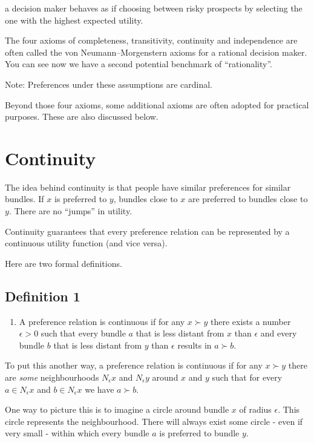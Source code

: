 \documentclass[
  letterpaper,
  DIV=11,
  numbers=noendperiod]{scrreprt}
\providecommand{\tightlist}{%
  \setlength{\itemsep}{0pt}\setlength{\parskip}{0pt}}\usepackage{longtable,booktabs,array}
\begin{document}
a decision maker behaves as if choosing between risky prospects by
selecting the one with the highest expected utility.

The four axioms of completeness, transitivity, continuity and
independence are often called the von Neumann--Morgenstern axioms for a
rational decision maker. You can see now we have a second potential
benchmark of ``rationality''.

Note: Preferences under these assumptions are cardinal.

Beyond those four axioms, some additional axioms are often adopted for
practical purposes. These are also discussed below.

\hypertarget{continuity}{%
\section{Continuity}\label{continuity}}

The idea behind continuity is that people have similar preferences for
similar bundles. If \(x\) is preferred to \(y\), bundles close to \(x\)
are preferred to bundles close to \(y\). There are no ``jumps'' in
utility.

Continuity guarantees that every preference relation can be represented
by a continuous utility function (and vice versa).

Here are two formal definitions.

\hypertarget{definition-1}{%
\subsection{Definition 1}\label{definition-1}}

\begin{enumerate}
\def\labelenumi{\arabic{enumi}.}
\tightlist
\item
  A preference relation is continuous if for any \(x \succ y\) there
  exists a number \(\epsilon > 0\) such that every bundle \(a\) that is
  less distant from \(x\) than \(\epsilon\) and every bundle \(b\) that
  is less distant from \(y\) than \(\epsilon\) results in \(a \succ b\).
\end{enumerate}

To put this another way, a preference relation is continuous if for any
\(x \succ y\) there are \emph{some} neighbourhoods \(N_\epsilon x\) and
\(N_\epsilon y\) around \(x\) and \(y\) such that for every
\(a\in N_\epsilon x\) and \(b\in N_\epsilon x\) we have \(a \succ b\).

One way to picture this is to imagine a circle around bundle \(x\) of
radius \(\epsilon\). This circle represents the neighbourhood. There
will always exist some circle - even if very small - within which every
bundle \(a\) is preferred to bundle \(y\).
\end{document}

